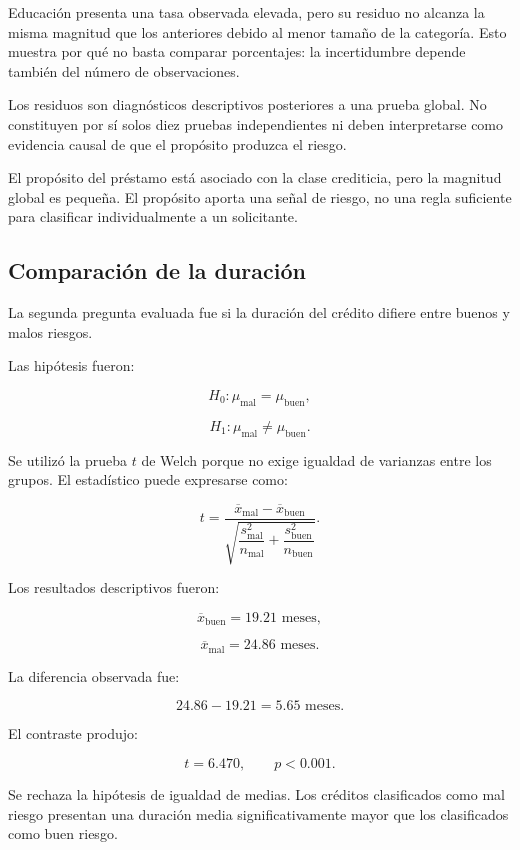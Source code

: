 Educación presenta una tasa observada elevada, pero su residuo no alcanza
la misma magnitud que los anteriores debido al menor tamaño de la
categoría. Esto muestra por qué no basta comparar porcentajes: la
incertidumbre depende también del número de observaciones.

Los residuos son diagnósticos descriptivos posteriores a una prueba
global. No constituyen por sí solos diez pruebas independientes ni deben
interpretarse como evidencia causal de que el propósito produzca el
riesgo.

\begin{hallazgo}
El propósito del préstamo está asociado con la clase crediticia, pero la
magnitud global es pequeña. El propósito aporta una señal de riesgo, no
una regla suficiente para clasificar individualmente a un solicitante.
\end{hallazgo}

\subsection{Comparación de la duración}

La segunda pregunta evaluada fue si la duración del crédito difiere entre
buenos y malos riesgos.

Las hipótesis fueron:

\[
H_0:
\mu_{\mathrm{mal}}
=
\mu_{\mathrm{buen}},
\]

\[
H_1:
\mu_{\mathrm{mal}}
\neq
\mu_{\mathrm{buen}}.
\]

Se utilizó la prueba \(t\) de Welch porque no exige igualdad de varianzas
entre los grupos. El estadístico puede expresarse como:

\[
t
=
\frac{
    \overline{x}_{\mathrm{mal}}
    -
    \overline{x}_{\mathrm{buen}}
}{
    \sqrt{
        \dfrac{s_{\mathrm{mal}}^2}{n_{\mathrm{mal}}}
        +
        \dfrac{s_{\mathrm{buen}}^2}{n_{\mathrm{buen}}}
    }
}.
\]

Los resultados descriptivos fueron:

\[
\overline{x}_{\mathrm{buen}}
=
19.21\text{ meses},
\]

\[
\overline{x}_{\mathrm{mal}}
=
24.86\text{ meses}.
\]

La diferencia observada fue:

\[
24.86-19.21
=
5.65\text{ meses}.
\]

El contraste produjo:

\[
t=6.470,
\qquad
p<0.001.
\]

Se rechaza la hipótesis de igualdad de medias. Los créditos clasificados
como mal riesgo presentan una duración media significativamente mayor que
los clasificados como buen riesgo.

